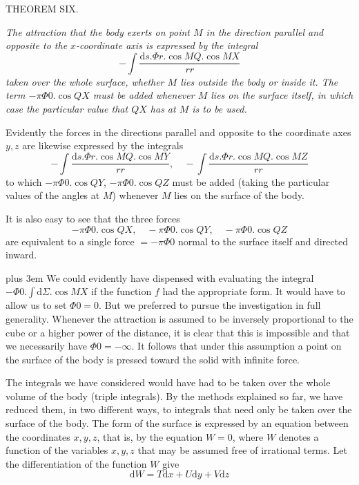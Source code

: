 \par\medskip{}
\centerline{THEOREM SIX.}\medskip
\par
{\itshape The attraction that the body exerts on point $M$ in the direction parallel and opposite to the $x$-coordinate axis is expressed by the integral
\[
-\int\frac{\mathrm{d}s.\Phi r.\cos MQ.\cos MX}{rr}
\]
taken over the whole surface, whether $M$ lies outside the body or inside it. The term $-\pi\Phi0.\cos QX$ must be added whenever $M$ lies on the surface itself, in which case the particular value that $QX$ has at $M$ is to be used.}\par
Evidently the forces in the directions parallel and opposite to the coordinate axes $y,z$ are likewise expressed by the integrals
\[
-\int\frac{\mathrm{d}s.\Phi r.\cos MQ.\cos MY}{rr},\quad-\int\frac{\mathrm{d}s.\Phi r.\cos MQ.\cos MZ}{rr}
\]
to which $-\pi\Phi0.\cos QY$, $-\pi\Phi0.\cos QZ$ must be added (taking the particular values of the angles at $M$) whenever $M$ lies on the surface of the body.

It is also easy to see that the three forces
\[
-\pi\Phi0.\cos QX,\quad-\pi\Phi0.\cos QY,\quad-\pi\Phi0.\cos QZ
\]
are equivalent to a single force $=-\pi\Phi0$ normal to the surface itself and directed inward.

{\rightskip=0pt plus 3em We could evidently have dispensed with evaluating the integral $-\Phi0.\int\mathrm{d}\Sigma.\cos MX$ if the function $f$ had the appropriate form. It would have to allow us to set $\Phi0=0$. But we preferred to pursue the investigation in full generality. Whenever the attraction is assumed to be inversely proportional to the cube or a higher power of the distance, it is clear that this is impossible and that we necessarily have $\Phi0=-\infty$. It follows that under this assumption a point on the surface of the body is pressed toward the solid with infinite force.\par}

\par
The integrals we have considered would have had to be taken over the whole volume of the body (triple integrals). By the methods explained so far, we have reduced them, in two different ways, to integrals that need only be taken over the surface of the body. The form of the surface is expressed by an equation between the coordinates $x,y,z$, that is, by the equation $W=0$, where $W$ denotes a function of the variables $x,y,z$ that may be assumed free of irrational terms. Let the differentiation of the function $W$ give
\[
\mathrm{d}W=T\mathrm{d}x+U\mathrm{d}y+V\mathrm{d}z
\]
